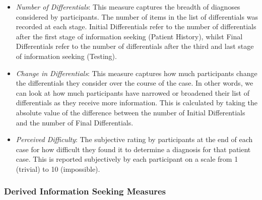 \documentclass[a4paper, nobind]{templates/ociamthesis}
\begin{document}
\begin{itemize}
\item
  \emph{Number of Differentials}: This measure captures the breadth of diagnoses considered by participants. The number of items in the list of differentials was recorded at each stage. Initial Differentials refer to the number of differentials after the first stage of information seeking (Patient History), whilst Final Differentials refer to the number of differentials after the third and last stage of information seeking (Testing).
\item
  \emph{Change in Differentials}: This measure captures how much participants change the differentials they consider over the course of the case. In other words, we can look at how much participants have narrowed or broadened their list of differentials as they receive more information. This is calculated by taking the absolute value of the difference between the number of Initial Differentials and the number of Final Differentials.
\item
  \emph{Perceived Difficulty}: The subjective rating by participants at the end of each case for how difficult they found it to determine a diagnosis for that patient case. This is reported subjectively by each participant on a scale from 1 (trivial) to 10 (impossible).
\end{itemize}

\subsubsection{Derived Information Seeking Measures}\label{derived-information-seeking-measures}
\end{document}
